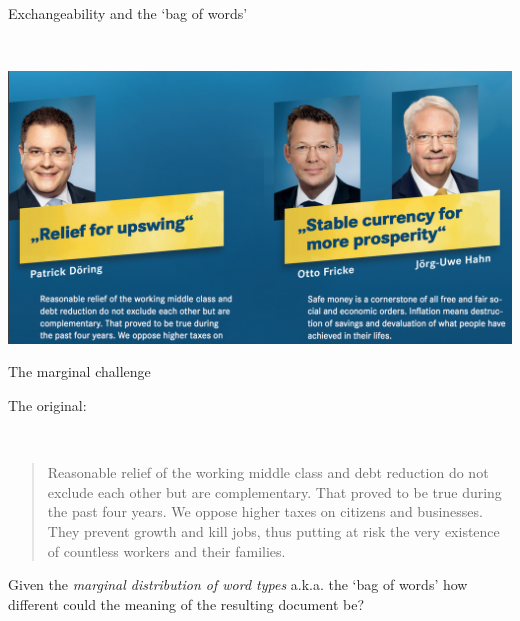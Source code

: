 \documentclass{hertieteaching}\usepackage[]{graphicx}\usepackage[]{color}
\begin{document}
{
    \begin{frame}{}
      \vfill
      \vspace{10ex}
      \centerline{\color{gray}\Huge\decorativeflower}
      \vfill
    \end{frame}
}

\begin{frame}{Exchangeability and the `bag of words'}

~\\
\centerline{\includegraphics[scale=0.4]{pictures/fdp-en.png}}

\end{frame}

\begin{frame}{The marginal challenge}

The original:

~\\
\begin{quote}
Reasonable relief of the working middle class and
debt reduction do not exclude each other but are
complementary. That proved to be true during
the past four years. We oppose higher taxes on
citizens and businesses. They prevent growth and
kill jobs, thus putting at risk the very existence of
countless workers and their families.
\end{quote}


Given the \textit{marginal distribution of word types} a.k.a. the `bag of words' how different could the meaning of the resulting document be?

\end{frame}
\end{document}
